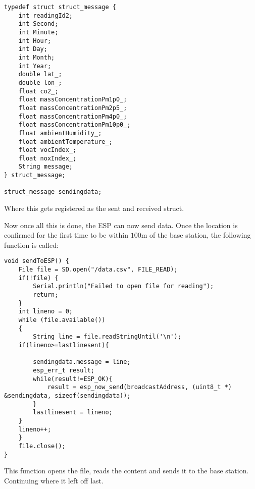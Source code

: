 \begin{lstlisting}
typedef struct struct_message {
	int readingId2;
	int Second;
	int Minute;
	int Hour;
	int Day;
	int Month;
	int Year;
	double lat_;
	double lon_;
	float co2_;
	float massConcentrationPm1p0_;
	float massConcentrationPm2p5_;
	float massConcentrationPm4p0_;
	float massConcentrationPm10p0_;
	float ambientHumidity_;
	float ambientTemperature_;
	float vocIndex_;
	float noxIndex_;  
	String message;
} struct_message;

struct_message sendingdata;
\end{lstlisting}
\noindent
Where this gets registered as the sent and received struct. 

\noindent
Now once all this is done, the ESP can now send data. Once the location is confirmed for the first time to be within $100 \si{\meter}$ of the base station, the following function is called:
\begin{lstlisting}
void sendToESP() {
	File file = SD.open("/data.csv", FILE_READ);
	if(!file) {
		Serial.println("Failed to open file for reading");
		return;
	}
	int lineno = 0;
	while (file.available())
	{
		String line = file.readStringUntil('\n');
	if(lineno>=lastlinesent){
		
		sendingdata.message = line;
		esp_err_t result;
		while(result!=ESP_OK){
			result = esp_now_send(broadcastAddress, (uint8_t *) &sendingdata, sizeof(sendingdata));
		}
		lastlinesent = lineno;
	}
	lineno++;
	}
	file.close();
}
\end{lstlisting}
This function opens the file, reads the content and sends it to the base station. Continuing where it left off last. 




